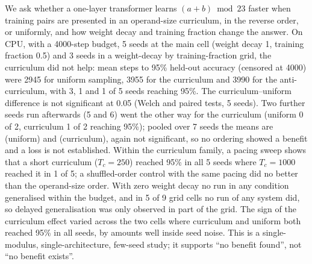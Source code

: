 We ask whether a one-layer transformer learns $(a+b)\bmod 23$ faster when training pairs are presented in an operand-size curriculum, in the reverse order, or uniformly, and how weight decay and training fraction change the answer. On CPU, with a 4000-step budget, 5 seeds at the main cell (weight decay 1, training fraction 0.5) and 3 seeds in a weight-decay by training-fraction grid, the curriculum did not help: mean steps to 95\% held-out accuracy (censored at 4000) were 2945 for uniform sampling, 3955 for the curriculum and 3990 for the anti-curriculum, with 3, 1 and 1 of 5 seeds reaching 95\%. The curriculum--uniform difference is not significant at 0.05 (Welch and paired tests, 5 seeds). Two further seeds run afterwards (5 and 6) went the other way for the curriculum (uniform 0 of 2, curriculum 1 of 2 reaching 95\%); pooled over 7 seeds the means are  (uniform) and  (curriculum), again not significant, so no ordering showed a benefit and a loss is not established. Within the curriculum family, a pacing sweep shows that a short curriculum ($T_c=250$) reached 95\% in all 5 seeds where $T_c=1000$ reached it in 1 of 5; a shuffled-order control with the same pacing did no better than the operand-size order. With zero weight decay no run in any condition generalised within the budget, and in 5 of 9 grid cells no run of any system did, so delayed generalisation was only observed in part of the grid. The sign of the curriculum effect varied across the two cells where curriculum and uniform both reached 95\% in all seeds, by amounts well inside seed noise. This is a single-modulus, single-architecture, few-seed study; it supports ``no benefit found'', not ``no benefit exists''.
